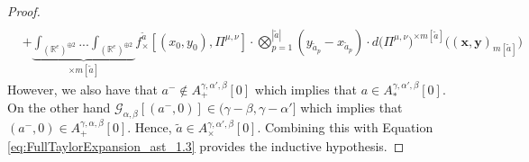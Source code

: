 \documentclass[a4paper,11pt,twoside]{article}
\numberwithin{equation}{section}
\theoremstyle{plain}
\newcommand{\bR}{\mathbb{R}}
\newcommand{\scG}{\mathscr{G}}
\newcommand{\1}{\mathbbm{1}}
\begin{document}
\begin{proof}
\begin{align}
			\\
			\label{eq:FullTaylorExpansion_ast_1.3}
			&+ \underbrace{ \int_{(\bR^e)^{\oplus 2}} ... \int_{(\bR^e)^{\oplus 2}} }_{\times m[\tilde{a}]} f_{\times}^{\tilde{a}}[ (x_0, y_0), \Pi^{\mu, \nu}] 
			\cdot 
			\bigotimes_{p=1}^{|\tilde{a}|} ( y_{\tilde{a}_p} - x_{\tilde{a}_p}) \cdot d\big( \Pi^{\mu, \nu}\big)^{\times m[\tilde{a}]} \Big( (\boldsymbol{x}, \boldsymbol{y})_{m[\tilde{a}]}\Big)
		\end{align}
		However, we also have that $a^{-} \notin A_{+}^{\gamma, \alpha', \beta}[0]$ which implies that $a\in A_{\ast}^{\gamma, \alpha', \beta}[0]$. On the other hand $\scG_{\alpha, \beta}[(a^-, 0)] \in (\gamma-\beta, \gamma - \alpha']$ which implies that $(a^-, 0) \in A_{+}^{\gamma, \alpha, \beta}[0]$. Hence, $\tilde{a}\in A_{\times}^{\gamma, \alpha', \beta}[0]$. Combining this with Equation \eqref{eq:FullTaylorExpansion_ast_1.3} provides the inductive hypothesis.
	\end{proof}
	
\end{document}
